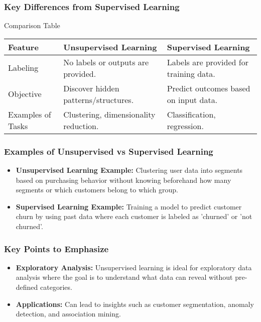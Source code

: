 \documentclass{beamer}
\begin{document}
\begin{frame}[fragile]
    \frametitle{Key Differences from Supervised Learning}
    \begin{block}{Comparison Table}
        \begin{tabular}{|l|l|l|}
            \hline
            Feature & Unsupervised Learning & Supervised Learning \\
            \hline
            Labeling & No labels or outputs are provided. & Labels are provided for training data. \\
            \hline
            Objective & Discover hidden patterns/structures. & Predict outcomes based on input data. \\
            \hline
            Examples of Tasks & Clustering, dimensionality reduction. & Classification, regression. \\
            \hline
        \end{tabular}
    \end{block}
\end{frame}

\begin{frame}[fragile]
    \frametitle{Examples of Unsupervised vs Supervised Learning}
    \begin{itemize}
        \item \textbf{Unsupervised Learning Example:} 
        Clustering user data into segments based on purchasing behavior without knowing beforehand how many segments or which customers belong to which group.
        
        \item \textbf{Supervised Learning Example:} 
        Training a model to predict customer churn by using past data where each customer is labeled as 'churned' or 'not churned'.
    \end{itemize}
\end{frame}

\begin{frame}[fragile]
    \frametitle{Key Points to Emphasize}
    \begin{itemize}
        \item \textbf{Exploratory Analysis:} 
        Unsupervised learning is ideal for exploratory data analysis where the goal is to understand what data can reveal without pre-defined categories.
        
        \item \textbf{Applications:} 
        Can lead to insights such as customer segmentation, anomaly detection, and association mining.
    \end{itemize}
\end{frame}
\end{document}
